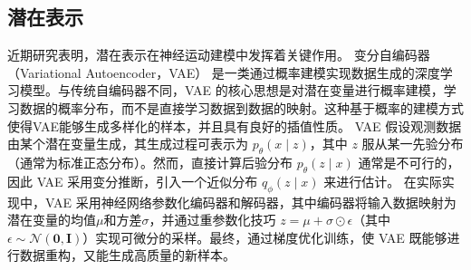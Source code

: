 \subsection{潜在表示}
近期研究表明，潜在表示在神经运动建模中发挥着关键作用。
变分自编码器（Variational Autoencoder，VAE）\cite{kingma2013vae} 是一类通过概率建模实现数据生成的深度学习模型。与传统自编码器不同，VAE 的核心思想是对潜在变量进行概率建模，学习数据的概率分布，而不是直接学习数据到数据的映射。这种基于概率的建模方式使得VAE能够生成多样化的样本，并且具有良好的插值性质。
VAE 假设观测数据由某个潜在变量生成，其生成过程可表示为 $p_{\theta}(x \mid z)$，其中 $z$ 服从某一先验分布（通常为标准正态分布）。然而，直接计算后验分布 $p_{\theta}(z \mid x)$ 通常是不可行的，因此 VAE 采用变分推断，引入一个近似分布 $q_{\phi}(z \mid x)$ 来进行估计。
在实际实现中，VAE 采用神经网络参数化编码器和解码器，其中编码器将输入数据映射为潜在变量的均值$\mu$和方差$\sigma$，并通过重参数化技巧 $z = \mu + \sigma \odot \epsilon$（其中 $\epsilon \sim \mathcal{N}(\mathbf{0}, \mathbf{I})$）实现可微分的采样。最终，通过梯度优化训练，使 VAE 既能够进行数据重构，又能生成高质量的新样本。

